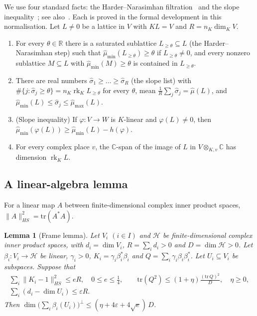 \documentclass[11pt]{amsart}
\newcommand{\CC}{\mathbb{C}}
\newcommand{\R}{\mathbb{R}}
\DeclareMathOperator{\rk}{rk}
\theoremstyle{plain}
\newtheorem{lemma}[theorem]{Lemma}
\theoremstyle{definition}
\numberwithin{equation}{section}
\begin{document}
We use four standard facts: the Harder--Narasimhan filtration~\cite{stuhler,grayson} and the slope
inequality~\cite{bost-bourbaki}; see also~\cite{gaudron,bost-chen}. Each is proved in the formal
development in this normalisation. Let $L\ne0$ be a
lattice in $V$ with $KL=V$ and $R=n_K\dim_KV$.
\begin{enumerate}[label=\textup{(HN\arabic*)}, leftmargin=3.6em]
\item For every $\theta\in\R$ there is a saturated sublattice $L_{\ge\theta}\subseteq L$ (the
  Harder--Narasimhan step) such that $\hat\mu_{\min}(L_{\ge\theta})\ge\theta$ if $L_{\ge\theta}\ne0$, and
  every nonzero sublattice $M\subseteq L$ with $\hat\mu_{\min}(M)\ge\theta$ is contained in $L_{\ge\theta}$.
\item There are real numbers $\hat\sigma_1\ge\dots\ge\hat\sigma_R$ (the slope list) with
  $\#\{j:\hat\sigma_j\ge\theta\}=n_K\rk_KL_{\ge\theta}$ for every $\theta$, mean
  $\frac1R\sum_j\hat\sigma_j=\hat\mu(L)$, and $\hat\mu_{\min}(L)\le\hat\sigma_j\le\hat\mu_{\max}(L)$.
\item (Slope inequality) If $\varphi:V\to W$ is $K$-linear and $\varphi(L)\ne0$, then
  $\hat\mu_{\min}(\varphi(L))\ge\hat\mu_{\min}(L)-h(\varphi)$.
\item For every complex place $v$, the $\CC$-span of the image of $L$ in $V\otimes_{K,v}\CC$ has
  dimension $\rk_KL$.
\end{enumerate}

\subsection{A linear-algebra lemma}

For a linear map $A$ between finite-dimensional complex inner product spaces,
$\|A\|_{HS}^2=\mathrm{tr}(A^*A)$.

\begin{lemma}[Frame lemma]\label{lem:framela}
Let $V_i$ $(i\in I)$ and $\mathcal H$ be finite-dimensional complex inner product spaces, with
$d_i=\dim V_i$, $R=\sum_id_i>0$ and $D=\dim\mathcal H>0$. Let $\beta_i:V_i\to\mathcal H$ be linear,
$\gamma_i>0$, $K_i=\gamma_i\beta_i^*\beta_i$ and $Q=\sum_i\gamma_i\beta_i\beta_i^*$. Let $U_i\subseteq V_i$
be subspaces. Suppose that
\begin{gather*}
\sum_i\|K_i-1\|_{HS}^2\le eR,\quad 0\le e\le\tfrac14,\qquad
\mathrm{tr}(Q^2)\le(1+\eta)\frac{(\mathrm{tr}\,Q)^2}{D},\quad\eta\ge0,\\
\sum_i(d_i-\dim U_i)\le\varepsilon R.
\end{gather*}
Then $\dim\bigl(\sum_i\beta_i(U_i)\bigr)^{\perp}\le(\eta+4\varepsilon+4\sqrt e)\,D$.
\end{lemma}
\end{document}
